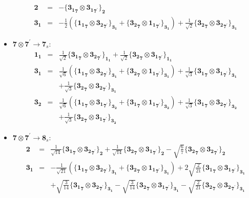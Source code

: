 \documentclass[english]{article}
\newcommand{\subcg}[3]{\big\{ {#1}\otimes{#2}\big\}^{}_{#3}}
\newcommand{\rep}[1]{\mathbf{#1}}
\begin{document}
\begin{itemize}
\begin{eqnarray*}
\\
\rep{2} &=& -\subcg{\rep{3_1}_{\rep{7}}}{\rep{3_1}_{\rep{7}^{\prime}}}{\rep{2}}
\\
\rep{3_1} &=& -\frac{1}{2}\left(\subcg{\rep{1_1}_{\rep{7}}}{\rep{3_2}_{\rep{7}^{\prime}}}{\rep{3_1}}+\subcg{\rep{3_2}_{\rep{7}}}{\rep{1_1}_{\rep{7}^{\prime}}}{\rep{3_1}}\right)+\frac{1}{\sqrt{2}}\subcg{\rep{3_2}_{\rep{7}}}{\rep{3_2}_{\rep{7}^{\prime}}}{\rep{3_1}}
\end{eqnarray*}
\item $\rep{7}\otimes\rep{7}^{\prime}\to\rep{7}_{s}$:
\begin{eqnarray*}
\rep{1_1} &=& \frac{1}{\sqrt{2}}\subcg{\rep{3_1}_{\rep{7}}}{\rep{3_2}_{\rep{7}^{\prime}}}{\rep{1_1}}+\frac{1}{\sqrt{2}}\subcg{\rep{3_2}_{\rep{7}}}{\rep{3_1}_{\rep{7}^{\prime}}}{\rep{1_1}}
\\
\rep{3_1} &=& \frac{1}{\sqrt{6}}\left(\subcg{\rep{1_1}_{\rep{7}}}{\rep{3_2}_{\rep{7}^{\prime}}}{\rep{3_1}}+\subcg{\rep{3_2}_{\rep{7}}}{\rep{1_1}_{\rep{7}^{\prime}}}{\rep{3_1}}\right)+\frac{1}{\sqrt{3}}\subcg{\rep{3_1}_{\rep{7}}}{\rep{3_1}_{\rep{7}^{\prime}}}{\rep{3_1}} \\ 
 & & +\frac{1}{\sqrt{3}}\subcg{\rep{3_2}_{\rep{7}}}{\rep{3_2}_{\rep{7}^{\prime}}}{\rep{3_1}}
\\
\rep{3_2} &=& \frac{1}{\sqrt{6}}\left(\subcg{\rep{1_1}_{\rep{7}}}{\rep{3_1}_{\rep{7}^{\prime}}}{\rep{3_2}}+\subcg{\rep{3_1}_{\rep{7}}}{\rep{1_1}_{\rep{7}^{\prime}}}{\rep{3_2}}\right)+\frac{1}{\sqrt{3}}\subcg{\rep{3_1}_{\rep{7}}}{\rep{3_2}_{\rep{7}^{\prime}}}{\rep{3_2}} \\ 
 & & +\frac{1}{\sqrt{3}}\subcg{\rep{3_2}_{\rep{7}}}{\rep{3_1}_{\rep{7}^{\prime}}}{\rep{3_2}}
\end{eqnarray*}
\item $\rep{7}\otimes\rep{7}^{\prime}\to\rep{8}_{s}$:
\begin{eqnarray*}
\rep{2} &=& \frac{1}{\sqrt{14}}\subcg{\rep{3_1}_{\rep{7}}}{\rep{3_2}_{\rep{7}^{\prime}}}{\rep{2}}+\frac{1}{\sqrt{14}}\subcg{\rep{3_2}_{\rep{7}}}{\rep{3_1}_{\rep{7}^{\prime}}}{\rep{2}}-\sqrt{\frac{6}{7}}\subcg{\rep{3_2}_{\rep{7}}}{\rep{3_2}_{\rep{7}^{\prime}}}{\rep{2}}
\\
\rep{3_1} &=& -\frac{1}{\sqrt{21}}\left(\subcg{\rep{1_1}_{\rep{7}}}{\rep{3_2}_{\rep{7}^{\prime}}}{\rep{3_1}}+\subcg{\rep{3_2}_{\rep{7}}}{\rep{1_1}_{\rep{7}^{\prime}}}{\rep{3_1}}\right)+2 \sqrt{\frac{2}{21}}\subcg{\rep{3_1}_{\rep{7}}}{\rep{3_1}_{\rep{7}^{\prime}}}{\rep{3_1}} \\ 
 & & +\sqrt{\frac{3}{14}}\subcg{\rep{3_1}_{\rep{7}}}{\rep{3_2}_{\rep{7}^{\prime}}}{\rep{3_1}}-\sqrt{\frac{3}{14}}\subcg{\rep{3_2}_{\rep{7}}}{\rep{3_1}_{\rep{7}^{\prime}}}{\rep{3_1}}-\sqrt{\frac{2}{21}}\subcg{\rep{3_2}_{\rep{7}}}{\rep{3_2}_{\rep{7}^{\prime}}}{\rep{3_1}}

\end{eqnarray*}
\end{itemize}
\end{document}
